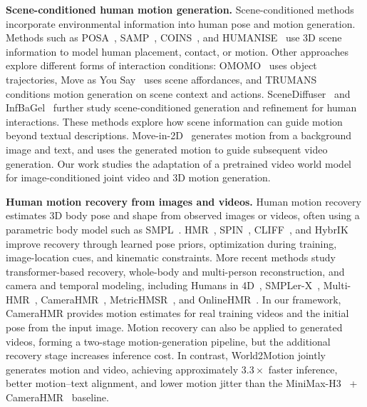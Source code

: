 \noindent \textbf{Scene-conditioned human motion generation.} Scene-conditioned methods incorporate environmental information into human pose and motion generation. Methods such as POSA~\citep{hassan2021posa}, SAMP~\citep{hassan2021samp}, COINS~\citep{zhao2022coins}, and HUMANISE~\citep{wang2022humanise} use 3D scene information to model human placement, contact, or motion. Other approaches explore different forms of interaction conditions: OMOMO~\citep{li2023omomo} uses object trajectories, Move as You Say~\citep{wang2024move} uses scene affordances, and TRUMANS~\citep{jiang2024trumans} conditions motion generation on scene context and actions. SceneDiffuser~\citep{huang2023scenediffuser} and InfBaGel~\citep{zou2026infbagel} further study scene-conditioned generation and refinement for human interactions. These methods explore how scene information can guide motion beyond textual descriptions. Move-in-2D~\citep{huang2025movein2d} generates motion from a background image and text, and uses the generated motion to guide subsequent video generation. Our work studies the adaptation of a pretrained video world model for image-conditioned joint video and 3D motion generation.

\noindent \textbf{Human motion recovery from images and videos.} Human motion recovery estimates 3D body pose and shape from observed images or videos, often using a parametric body model such as SMPL~\citep{SMPL:2015}. HMR~\citep{kanazawa2018hmr}, SPIN~\citep{kolotouros2019spin}, CLIFF~\citep{li2022cliff}, and HybrIK~\citep{li2021hybrik} improve recovery through learned pose priors, optimization during training, image-location cues, and kinematic constraints. More recent methods study transformer-based recovery, whole-body and multi-person reconstruction, and camera and temporal modeling, including Humans in 4D~\citep{goel2023humansin4d}, SMPLer-X~\citep{cai2023smpler}, Multi-HMR~\citep{baradel2024multihmr}, CameraHMR~\citep{patel2025camerahmr}, MetricHMSR~\citep{song2026metrichmsr}, and OnlineHMR~\citep{zhao2026onlinehmr}. In our framework, CameraHMR provides motion estimates for real training videos and the initial pose from the input image. Motion recovery can also be applied to generated videos, forming a two-stage motion-generation pipeline, but the additional recovery stage increases inference cost. In contrast, World2Motion jointly generates motion and video, achieving approximately $3.3\times$ faster inference, better motion--text alignment, and lower motion jitter than the MiniMax-H3~\citep{minimaxh3} + CameraHMR~\citep{patel2025camerahmr} baseline.

